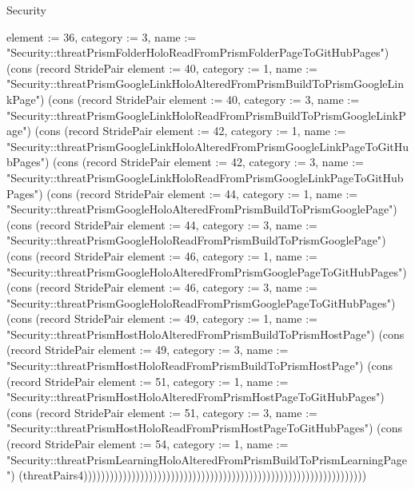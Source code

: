 \begin{lexlean}{Security}
\begin{semanticmodule}
{{element := 36, category := 3, name := "Security::threatPrismFolderHoloReadFromPrismFolderPageToGitHubPages"}) (cons (record StridePair {element := 40, category := 1, name := "Security::threatPrismGoogleLinkHoloAlteredFromPrismBuildToPrismGoogleLinkPage"}) (cons (record StridePair {element := 40, category := 3, name := "Security::threatPrismGoogleLinkHoloReadFromPrismBuildToPrismGoogleLinkPage"}) (cons (record StridePair {element := 42, category := 1, name := "Security::threatPrismGoogleLinkHoloAlteredFromPrismGoogleLinkPageToGitHubPages"}) (cons (record StridePair {element := 42, category := 3, name := "Security::threatPrismGoogleLinkHoloReadFromPrismGoogleLinkPageToGitHubPages"}) (cons (record StridePair {element := 44, category := 1, name := "Security::threatPrismGoogleHoloAlteredFromPrismBuildToPrismGooglePage"}) (cons (record StridePair {element := 44, category := 3, name := "Security::threatPrismGoogleHoloReadFromPrismBuildToPrismGooglePage"}) (cons (record StridePair {element := 46, category := 1, name := "Security::threatPrismGoogleHoloAlteredFromPrismGooglePageToGitHubPages"}) (cons (record StridePair {element := 46, category := 3, name := "Security::threatPrismGoogleHoloReadFromPrismGooglePageToGitHubPages"}) (cons (record StridePair {element := 49, category := 1, name := "Security::threatPrismHostHoloAlteredFromPrismBuildToPrismHostPage"}) (cons (record StridePair {element := 49, category := 3, name := "Security::threatPrismHostHoloReadFromPrismBuildToPrismHostPage"}) (cons (record StridePair {element := 51, category := 1, name := "Security::threatPrismHostHoloAlteredFromPrismHostPageToGitHubPages"}) (cons (record StridePair {element := 51, category := 3, name := "Security::threatPrismHostHoloReadFromPrismHostPageToGitHubPages"}) (cons (record StridePair {element := 54, category := 1, name := "Security::threatPrismLearningHoloAlteredFromPrismBuildToPrismLearningPage"}) (threatPairs4)))))))))))))))))))))))))))))))))))))))))))))))))))))))))))))))))
}


\end{semanticmodule}
\end{lexlean}
